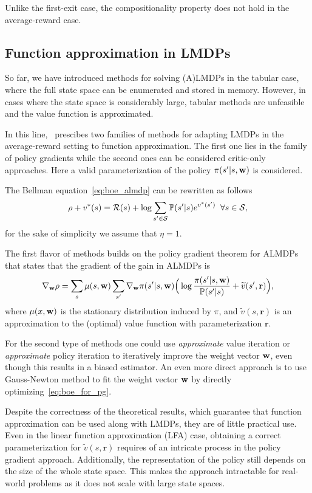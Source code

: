 Unlike the first-exit case, the compositionality property does not hold in the average-reward case.

\subsection{Function approximation in LMDPs}

So far, we have introduced methods for solving (A)LMDPs in the tabular case, where the full state space can be enumerated and stored in memory. However, in cases where the state space is considerably large, tabular methods are unfeasible and the value function is approximated.

In this line,~\cite{Todorov2010} prescibes two families of methods for adapting LMDPs in the average-reward setting to function approximation. The first one lies in the family of policy gradients while the second ones can be considered critic-only approaches. Here a valid parameterization of the policy $\pi(s'\lvert s, \mathbf{w})$ is considered.

The Bellman equation~\eqref{eq:boe_almdp} can be rewritten as follows
\begin{equation}
\label{eq:boe_for_pg}
\rho + v^*(s) =\mathcal{R}(s) +\log{\sum_{s'\in\mathcal{S}}\mathbb{P}(s'\lvert s)e^{v^*(s')}} \;\;\forall s\in\mathcal{S},
\end{equation}
for the sake of simplicity we assume that $\eta=1$. 

The first flavor of methods builds on the policy gradient theorem for ALMDPs~\citep[cf.~Theorem 1]{Todorov2010} that states that the gradient of the gain in ALMDPs is
\begin{equation}
  \nabla_{\mathbf{w}} \rho = \sum_{s}\mu(s, \mathbf{w}) \sum_{s'} \nabla_{\mathbf{w}} \pi(s'\lvert s, \mathbf{w})\Big( \log \frac{\pi(s'\lvert s, \mathbf{w})}{\mathbb{P}(s'\lvert s)} + \widetilde v(s', \mathbf{r})\Big),
\end{equation}
where $\mu(x, \mathbf{w})$ is the stationary distribution induced by $\pi$, and $\widetilde v(s,\mathbf{r})$ is an approximation to the (optimal) value function with parameterization $\mathbf r$.

For the second type of methods one could use \textit{approximate} value iteration or \textit{approximate} policy iteration to iteratively improve the weight vector $\mathbf{w}$, even though this results in a biased estimator. An even more direct approach is to use Gauss-Newton method to fit the weight vector $\mathbf{w}$ by directly optimizing~\eqref{eq:boe_for_pg}.

Despite the correctness of the theoretical results, which guarantee that function approximation can be used along with LMDPs, they are of little practical use. Even in the linear function approximation (LFA) case, obtaining a correct parameterization for $\widetilde v(s,\mathbf{r})$ requires of an intricate process in the policy gradient approach. Additionally, the representation of the policy still depends on the size of the whole state space. This makes the approach intractable for real-world problems as it does not scale with large state spaces.



